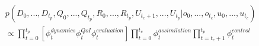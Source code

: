 \begin{equation}
\begin{aligned}
    & p(D_{0},...,D_{t_{p}},Q_{0},...,Q_{t_{p}},R_{0},...,R_{t_{p}},U_{t_{c}+1},...,U_{t_{p}}|o_{0},...,o_{t_{c}},u_{0},...,u_{t_{c}}) \\
    & \propto \prod_{t=0}^{t_{p}}[\phi_{t}^{dynamics}\phi_{t}^{QoI}\phi_{t}^{evaluation}] \prod_{t=0}^{t_{c}}\phi_{t}^{assimilation} \prod_{t=t_{c}+1}^{t_{p}}\phi_{t}^{control} \label{equation 2.2}
\end{aligned}
\end{equation}